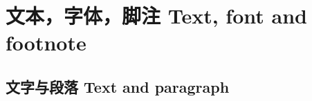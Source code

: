 \documentclass[draft,twoside]{fduthesis}
\begin{document}
\raggedbottom
%
%
%
%
%

\mainmatter

\def\PLACEHOLDERi{————汉字————汉字————汉字————汉字————汉字————六七八九十}
\def\PLACEHOLDER{\zhlipsum[1]}%

\chapter{文本，字体，脚注 \quad Text, font and footnote}

\zhlipsum[1]

\section{文字与段落 Text and paragraph}
\zhlipsum[1-2]
\end{document}
